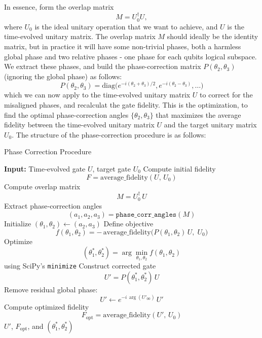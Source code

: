 \documentclass{subfiles}
\begin{document}
In essence, form the overlap matrix 
\begin{equation*}
  M = U_0^\dagger U,
\end{equation*}
where $U_0$ is the ideal unitary operation that we want to achieve, and $U$ is the time-evolved unitary matrix. The overlap matrix $M$ should ideally be the identity matrix, but in practice it will have some non-trivial phases, both a harmless global phase and two relative phases - one phase for each qubits logical subspace. We extract these phases, and build the phase-correction matrix $P(\theta_2, \theta_3)$ (ignoring the global phase) as follows:
\begin{equation*}
    P(\theta_2, \theta_3) = \text{diag}\bigg(e^{-i(\theta_2 + \theta_3)/2}, e^{-i(\theta_2 - \theta_3)},\dots\bigg)
\end{equation*}
which we can now apply to the time-evolved unitary matrix $U$ to correct for the misaligned phases, and recalculat the gate fidelity. This is the optimization, to find the optimal phase-correction angles $\{\theta_2, \theta_3\}$ that maximizes the average fidelity between the time-evolved unitary matrix $U$ and the target unitary matrix $U_0$.
The structure of the phase-correction procedure is as follows:
\begin{algorithm}[H]
\caption{Phase Correction Procedure}
\label{alg:phase_correction}
\begin{algorithmic}[1]
  \State \textbf{Input:} Time‐evolved gate $U$, target gate $U_0$
  \State Compute initial fidelity 
    \[
      F = \mathrm{average\_fidelity}(U,\,U_0)
    \]
  \State Compute overlap matrix 
    \[
      M = U_{0}^{\dagger}\,U
    \]
  \State Extract phase‐correction angles 
    \[
      (a_1,a_2,a_3) = \texttt{phase\_corr\_angles}(M)
    \]
  \State Initialize $(\theta_1,\theta_2) \leftarrow (a_2,a_3)$
  \State Define objective
    \[
      f(\theta_1,\theta_2)
      = -\,\mathrm{average\_fidelity}\bigl(P(\theta_1,\theta_2)\,U,\;U_0\bigr)
    \]
  \State Optimize 
    \[
      (\theta_1^*,\theta_2^*)
      = \arg\min_{\theta_1,\theta_2} f(\theta_1,\theta_2)
    \]
    using SciPy’s \texttt{minimize}
  \State Construct corrected gate 
    \[
      U' = P(\theta_1^*,\theta_2^*) \, U
    \]
  \State Remove residual global phase:
    \[
      U' \leftarrow e^{-i\,\arg(U'_{00})}\,U'
    \]
  \State Compute optimized fidelity 
    \[
      F_{\mathrm{opt}} = \mathrm{average\_fidelity}(U',\,U_0)
    \]
  \State \Return $U'$, $F_{\mathrm{opt}}$, and $(\theta_1^*,\theta_2^*)$
\end{algorithmic}
\end{algorithm}
\end{document}
